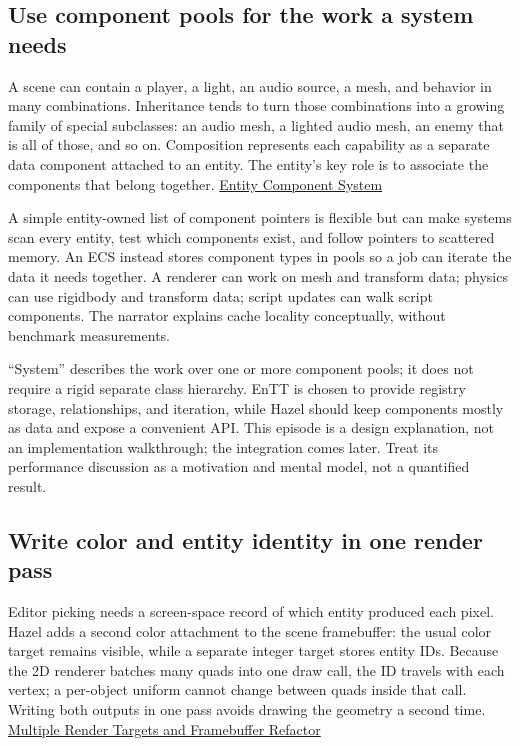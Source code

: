 \subsection{Use component pools for the work a system needs}\label{06-engine-ii-ch031-use-component-pools-for-the-work-a-system-needs}

A scene can contain a player, a light, an audio source, a mesh, and behavior in many combinations. Inheritance tends to turn those combinations into a growing family of special subclasses: an audio mesh, a lighted audio mesh, an enemy that is all of those, and so on. Composition represents each capability as a separate data component attached to an entity. The entity's key role is to associate the components that belong together. \href{https://www.youtube.com/watch?v=Z-CILn2w9K0}{Entity Component System}

A simple entity-owned list of component pointers is flexible but can make systems scan every entity, test which components exist, and follow pointers to scattered memory. An ECS instead stores component types in pools so a job can iterate the data it needs together. A renderer can work on mesh and transform data; physics can use rigidbody and transform data; script updates can walk script components. The narrator explains cache locality conceptually, without benchmark measurements.

``System'' describes the work over one or more component pools; it does not require a rigid separate class hierarchy. EnTT is chosen to provide registry storage, relationships, and iteration, while Hazel should keep components mostly as data and expose a convenient API. This episode is a design explanation, not an implementation walkthrough; the integration comes later. Treat its performance discussion as a motivation and mental model, not a quantified result.

\subsection{Write color and entity identity in one render pass}\label{06-engine-ii-ch031-write-color-and-entity-identity-in-one-render-pass}

Editor picking needs a screen-space record of which entity produced each pixel. Hazel adds a second color attachment to the scene framebuffer: the usual color target remains visible, while a separate integer target stores entity IDs. Because the 2D renderer batches many quads into one draw call, the ID travels with each vertex; a per-object uniform cannot change between quads inside that call. Writing both outputs in one pass avoids drawing the geometry a second time. \href{https://www.youtube.com/watch?v=f-GbHye1VFQ}{Multiple Render Targets and Framebuffer Refactor}

